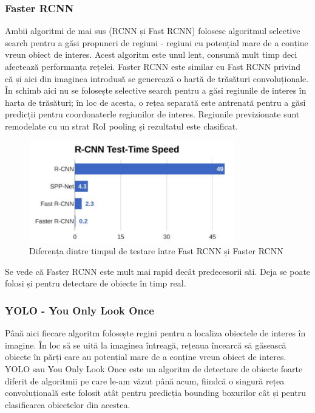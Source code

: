 \subsubsection{Faster RCNN}
Ambii algoritmi de mai sus (RCNN și Fast RCNN) folosesc algoritmul selective search pentru a găsi propuneri de regiuni - regiuni cu potențial mare de a conține vreun obiect de interes. Acest algoritm este unul lent, consumă mult timp deci afectează performanța rețelei.\newline
Faster RCNN este similar cu Fast RCNN privind că și aici din imaginea introdusă se generează o hartă de trăsături convoluționale. În schimb aici nu se folosește selective search pentru a găsi regiunile de interes în harta de trăsături; în loc de acesta, o rețea separată este antrenată pentru a găsi predicții pentru coordonaterle regiunilor de interes. Regiunile previzionate sunt remodelate cu un strat RoI pooling și rezultatul este clasificat.

\begin{figure}[h!]
    	\centering
	\captionsetup{justification=centering, margin=2cm}
	\includegraphics[width=0.8\textwidth]{figures/faster_rcnn_speed.png}
	\caption{Diferența dintre timpul de testare între  Fast RCNN și  Faster RCNN \cite{rcnn_vs_fast_rcnn}}
	\label{fig:class_detect_segment}
\end{figure}
Se vede că Faster RCNN este mult mai rapid decât predecesorii săi. Deja se poate folosi și pentru detectare de obiecte în timp real.

\subsubsection{YOLO - You Only Look Once}
Până aici fiecare algoritm folosește regini pentru a localiza obiectele de interes în imagine. În loc să se uită la imaginea întreagă, rețeaua încearcă să găsească obiecte în părți care au potențial mare de a conține vreun obiect de interes.\newline
YOLO sau You Only Look Once este un algoritm de detectare de obiecte foarte diferit de algoritmii pe care le-am văzut până acum, fiindcă o singură rețea convoluțională este folosit atât pentru predicția bounding boxurilor cât și pentru clasificarea obiectelor din acestea.

